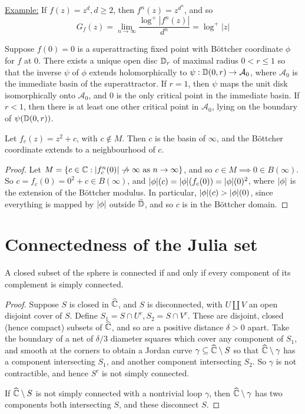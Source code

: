 \documentclass[10pt,a4paper]{article}
\begin{document}
\underline{Example:} If $f(z) = z^d, d\geq 2$, then $f^n(z) = z^{d^n}$, and so
\[G_f(z) = \lim_{n\to \infty}\frac{\log^+|f^n(z)|}{d^n} = \log^+|z|\]

\begin{theorem}
  Suppose $f(0) = 0$ is a superattracting fixed point with B\"ottcher coordinate $\phi$ for $f$ at $0$. There exists a unique open disc $\mathbb{D}_r$ of maximal radius $0 < r \leq 1$ so that the inverse $\psi$ of $\phi$ extends holomorphically to $\psi:\mathbb{D}(0, r) \to \mathcal{A}_0$, where $\mathcal{A}_0$ is the immediate basin of the superattractor. If $r = 1$, then $\psi$ maps the unit disk isomorphically onto $\mathcal{A}_0$, and $0$ is the only critical point in the immediate basin. If $r<1$, then there is at least one other critical point in $\mathcal{A}_0$, lying on the boundary of $\psi(\mathbb{D}(0, r))$.
\end{theorem}
\begin{corollary}
  Let $f_c(z) = z^2+c$, with $c \notin M$. Then $c$ is the basin of $\infty$, and the B\"ottcher coordinate extends to a neighbourhood of $c$.
\end{corollary}
\begin{proof}
  Let $M = \{c \in \C : |f_c^n(0)|\centernot\to \infty \text{ as } n \to \infty\}$, and so $c \in M \implies 0 \in B(\infty)$. So $c = f_c(0) = 0^2 + c \in B(\infty)$, and $\lvert\phi\rvert(c) = \lvert\phi\rvert(f_c(0)) = \lvert\phi\rvert(0)^2$, where $\lvert\phi\rvert$ is the extension of the B\"ottcher modulus. In particular, $\lvert\phi\rvert(c) > \lvert\phi\rvert(0)$, since everything is mapped by $\lvert\phi\rvert$ outside $\bar{\mathbb{D}}$, and so $c$ is in the B\"ottcher domain.
\end{proof}
\section{Connectedness of the Julia set}
\begin{proposition}
  A closed subset of the sphere is connected if and only if every component of its complement is simply connected.
\end{proposition}
\begin{proof}
  Suppose $S$ is closed in $\widehat{\mathbb{C}}$, and $S$ is disconnected, with $U \coprod V$ an open disjoint cover of $S$. Define $S_1 = S \cap U^c, S_2 = S \cap V^c$. These are disjoint, closed (hence compact) subsets of $\widehat{\mathbb{C}}$, and so are a positive distance $\delta > 0$ apart. Take the boundary of a net of $\delta/3$ diameter squares which cover any component of $S_1$, and smooth at the corners to obtain a Jordan curve $\gamma \subseteq \widehat{\mathbb{C}}\setminus S$ so that $\widehat{\mathbb{C}}\setminus \gamma$ has a component intersecting $S_1$, and another component intersecting $S_2$. So $\gamma$ is not contractible, and hence $S^c$ is not simply connected.

  If $\widehat{\mathbb{C}} \setminus S$ is not simply connected with a nontrivial loop $\gamma$, then $\widehat{\mathbb{C}}\setminus \gamma$ has two components both intersecting $S$, and these disconnect $S$.
\end{proof}
\end{document}
